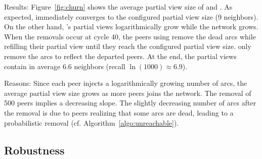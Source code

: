 \begin{asparadesc}
\item[Results:] Figure~\ref{fig:churn} shows the average partial view size of
  \SPRAY and \CYCLON. As expected, \CYCLON immediately converges to the
  configured partial view size (9 neighbors). On the other hand, \SPRAY's
  partial views logarithmically grow while the network grows. When the removals
  occur at cycle 40, the peers using \CYCLON remove the dead arcs while
  refilling their partial view until they reach the configured partial view
  size. \SPRAY only remove the arcs to reflect the departed peers. At the end,
  the \SPRAY partial views contain in average 6.6 neighbors (recall
  $\ln(1000)\approx 6.9$).
\item[Reasons:] Since each peer injects a logarithmically growing number of
  arcs, the average partial view size grows as more peers joins the network.
  The removal of 500 peers implies a decreasing slope. The slightly decreasing
  number of arcs after the removal is due to peers realizing that some arcs are
  dead, leading to a probabilistic removal (cf. Algorithm~\ref{algo:unreachable}).
\end{asparadesc}


\subsection{Robustness}

